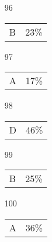 \documentclass[12pt]{article}
\begin{document}
\begin{multicols}{5}
\begin{enumerate}
\item[]
\item[96] \begin{tabular}{cc} B & 23\%\end{tabular}
\item[97] \begin{tabular}{cc} A & 17\%\end{tabular}
\item[98] \begin{tabular}{cc} D & 46\%\end{tabular}
\item[99] \begin{tabular}{cc} B & 25\%\end{tabular}
\item[100] \begin{tabular}{cc} A & 36\%\end{tabular}

\item[]

\end{enumerate}
\end{multicols}
\clearpage
\end{document}

